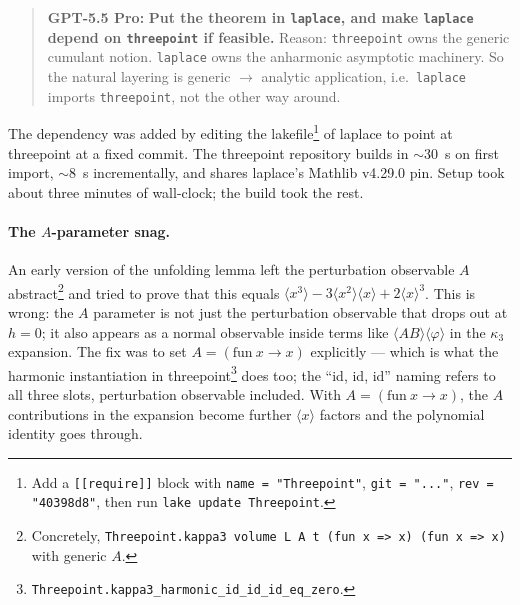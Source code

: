 \documentclass[11pt]{article}
\newcommand{\gptbox}[1]{\par\medskip\begin{quote}\small\textbf{\textcolor{green!50!black}{GPT-5.5 Pro:}} #1\end{quote}\medskip}
\begin{document}
\gptbox{\textbf{Put the theorem in \texttt{laplace}, and make
\texttt{laplace} depend on \texttt{threepoint} if feasible.} Reason:
\texttt{threepoint} owns the generic cumulant notion. \texttt{laplace}
owns the anharmonic asymptotic machinery. So the natural layering is
generic $\to$ analytic application, i.e.\ \texttt{laplace} imports
\texttt{threepoint}, not the other way around.}

The dependency was added by editing the lakefile\footnote{Add a
\texttt{[[require]]} block with \texttt{name = "Threepoint"},
\texttt{git = "..."}, \texttt{rev = "40398d8"}, then run
\texttt{lake update Threepoint}.} of laplace to point at threepoint at
a fixed commit. The threepoint repository builds in $\sim$30~s on first
import, $\sim$8~s incrementally, and shares laplace's Mathlib v4.29.0
pin. Setup took about three minutes of wall-clock; the build took the
rest.

\paragraph{The $A$-parameter snag.} An early version of the unfolding
lemma left the perturbation observable $A$ abstract\footnote{Concretely,
\texttt{Threepoint.kappa3 volume L A t (fun x => x) (fun x => x)} with
generic $A$.} and tried to prove that this equals
$\langle x^3 \rangle - 3 \langle x^2 \rangle \langle x \rangle + 2 \langle x \rangle^3$.
This is wrong: the $A$ parameter is not just the perturbation observable
that drops out at $h = 0$; it also appears as a normal observable
inside terms like $\langle A B \rangle \langle \varphi \rangle$ in the
$\kappa_3$ expansion. The fix was to set $A = (\mathrm{fun}\ x \to x)$
explicitly --- which is what the harmonic instantiation in
threepoint\footnote{\texttt{Threepoint.kappa3\_harmonic\_id\_id\_id\_eq\_zero}.}
does too; the ``id, id, id'' naming refers to all three slots,
perturbation observable included. With $A = (\mathrm{fun}\ x \to x)$,
the $A$ contributions in the expansion become further $\langle x \rangle$
factors and the polynomial identity goes through.
\end{document}
